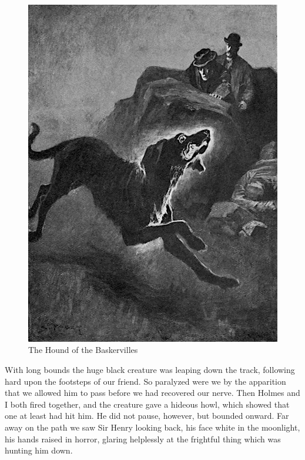\documentclass[paper=5.5in:8.5in,BCOR=7mm,twoside,DIV=calc,12pt,usegeometry,openany,chapterprefix,endperiod]{scrbook} %
\begin{document}
\begin{figure}[tbph]
\centering
\includegraphics[width=\linewidth]{14_thehound}
\caption{The Hound of the Baskervilles}
\end{figure}

With long bounds the huge black creature was leaping down the track, following hard upon the footsteps of our friend. So paralyzed were we by the apparition that we allowed him to pass before we had recovered our nerve. Then Holmes and I both fired together, and the creature gave a hideous howl, which showed that one at least had hit him. He did not pause, however, but bounded onward. Far away on the path we saw Sir Henry looking back, his face white in the moonlight, his hands raised in horror, glaring helplessly at the frightful thing which was hunting him down.
\end{document}
